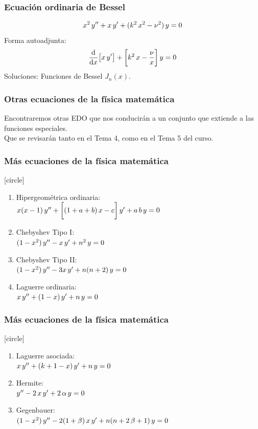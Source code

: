 \documentclass[12pt]{beamer}
\begin{document}
\begin{frame}
\frametitle{Ecuación ordinaria de Bessel}
\begin{align*}
x^{2} \, {y}^{\prime \prime} + x \, {y}^{\prime} + ( k^{2} \, x^{2} - \nu^{2}) \, y = 0
\end{align*}
\pause
Forma autoadjunta:
\begin{align*}
\dv{x} \big[ x \, {y}^{\prime} \big] + \bigg[ k^{2} \, x - \dfrac{\nu}{x} \bigg] \, y = 0
\end{align*}
\pause
Soluciones: Funciones de Bessel $J_{n}(x)$.
\end{frame}
\begin{frame}
\frametitle{Otras ecuaciones de la física matemática}
Encontraremos otras EDO que nos conducirán a un conjunto que extiende a las funciones especiales.
\\
\bigskip
\pause
Que se revisarán tanto en el Tema 4, como en el Tema 5 del curso.
\end{frame}
\begin{frame}
\frametitle{Más ecuaciones de la física matemática}
[circle]
\begin{enumerate}[<+->]
\item Hipergeométrica ordinaria: \\
$x (x - 1) \, {y}^{\prime \prime} + \bigg[ (1 + a + b) \, x - c \bigg] \, {y}^{\prime} + a \, b \, y = 0$
\item Chebyshev Tipo I: \\
$(1 - x^{2}) \, {y}^{\prime \prime} - x \, {y}^{\prime} + n^{2} \, y = 0$
\item Chebyshev Tipo II: \\
$(1 - x^{2}) \, {y}^{\prime \prime} - 3 x \, {y}^{\prime} + n(n + 2) \, y = 0$
\item Laguerre ordinaria: \\
$x \, {y}^{\prime \prime} + (1 - x) \, {y}^{\prime} + n \, y = 0$
\seti
\end{enumerate}
\end{frame}
\begin{frame}
\frametitle{Más ecuaciones de la física matemática}
[circle]
\begin{enumerate}[<+->]
\conti    
\item Laguerre asociada: \\
$x \, {y}^{\prime \prime} + (k + 1 - x) \, {y}^{\prime} + n \, y = 0$
\item Hermite: \\
${y}^{\prime \prime} - 2 \, x \, {y}^{\prime} + 2 \, \alpha \, y = 0$
\item Gegenbauer: \\
$(1 - x^{2}) \, {y}^{\prime \prime} - 2 (1 + \beta) \, x \, {y}^{\prime} + n(n + 2 \, \beta + 1) \, y = 0$
\end{enumerate}
\end{frame}
\end{document}
